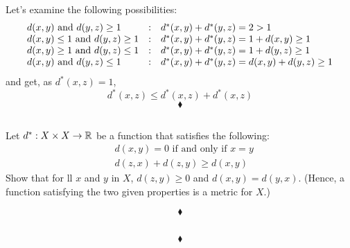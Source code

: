 Let's examine the following possibilities:
\begin{align*}
\begin{array}{l c  l}
d(x, y)\text{ and } d(y, z)\geq 1&: &d^*(x, y)+d^*(y, z)=2>1\\
d(x, y)\leq 1\text{ and } d(y, z)\geq 1&: &d^*(x, y)+d^*(y, z)=1+d(x, y)\geq 1\\
d(x, y)\geq 1 \text{ and } d(y, z)\leq 1&: &d^*(x, y)+d^*(y, z)=1+d(y, z)\geq 1
\\
d(x, y)\text{ and } d(y, z)\leq 1&: &d^*(x, y)+d^*(y, z)=d(x, y)+d(y, z)\geq 1
\end{array}
\end{align*}
and get, as $d^*(x, z)=1$, $$d^*(x, z)\leq d^*(x, z)+d^*(x, z)$$
$$\blacklozenge$$

\renewcommand{\thesubsection}{\thesection.\arabic{subsection}}
\subsection{}
\begin{tcolorbox}
Let $d^*:X \times X \rightarrow \mathbb{R}$ be a function that satisfies the following:
\begin{align*}
&d(x,y)=0 \text{ if and only if } x=y\\
&d(z,x)+d(z,y)\geq d(x,y)
\end{align*}
Show that for ll $x$ and $y$ in $X$, $d(z,y)\geq 0$ and $d(x,y)=d(y,x)$. (Hence, a function satisfying the two given properties is a metric for $X$.)
\end{tcolorbox}

$$\blacklozenge$$
\newpage


\renewcommand{\thesubsection}{\thesection.\arabic{subsection}}
\setcounter{subsection}{0}
\subsection{}
\begin{tcolorbox}

\end{tcolorbox}

$$\blacklozenge$$

\newpage

